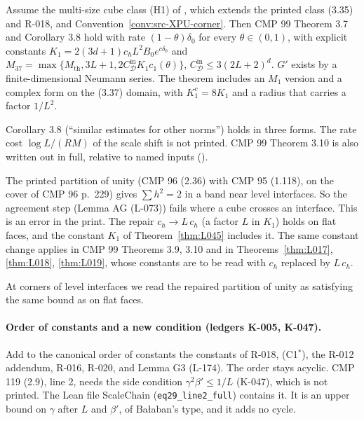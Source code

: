 \begin{theorem}\label{thm:L045}
Assume the multi-size cube class (H1) of , which extends the printed class (3.35) and R-018, and Convention~\ref{conv:src-XPU-corner}. Then CMP 99 Theorem 3.7 and Corollary 3.8 hold with rate $(1-\theta)\delta_0$ for every $\theta\in(0,1)$, with explicit constants $K_1=2(3d+1)c_hL^2B_0e^{c\delta_0}$ and $M_{37}=\max\{M_{\mathrm{th}},3L+1,2C_{\mathcal D}^{\mathrm{in}}K_1c_1(\theta)\}$, $C_{\mathcal D}^{\mathrm{in}}\le3(2L+2)^d$. $G'$ exists by a finite-dimensional Neumann series. The theorem includes an $M_1$ version and a complex form on the (3.37) domain, with $K_1^c=8K_1$ and a radius that carries a factor $1/L^2$.
\end{theorem}
Corollary 3.8 (``similar estimates for other norms'') holds in three forms. The rate cost $\log L/(RM)$ of the scale shift is not printed. CMP 99 Theorem 3.10 is also written out in full, relative to named inputs ().

\begin{remark}
The printed partition of unity (CMP 96 (2.36) with CMP 95 (1.118), on the cover of CMP 96 p.~229) gives $\sum h^2=2$ in a band near level interfaces. So the agreement step (Lemma AG (L-073)) fails where a cube crosses an interface. This is an error in the print. The repair $c_h\to L\,c_h$ (a factor $L$ in $K_1$) holds on flat faces, and the constant $K_1$ of Theorem~\ref{thm:L045} includes it. The same constant change applies in CMP 99 Theorems 3.9, 3.10 and in Theorems~\ref{thm:L017}, \ref{thm:L018}, \ref{thm:L019}, whose constants are to be read with $c_h$ replaced by $L\,c_h$.
\end{remark}

\begin{convention}\label{conv:src-XPU-corner}
At corners of level interfaces we read the repaired partition of unity as satisfying the same bound as on flat faces.
\end{convention}

\paragraph{Order of constants and a new condition (ledgers K-005, K-047).}
\begin{remark}\label{src:ORDER-CANON-EF}
Add to the canonical order of constants the constants of R-018, (C1$^*$), the R-012 addendum, R-016, R-020, and Lemma G3 (L-174). The order stays acyclic. CMP 119 (2.9), line 2, needs the side condition $\gamma^2\beta'\le1/L$ (K-047), which is not printed. The Lean file ScaleChain (\texttt{eq29\_line2\_full}) contains it. It is an upper bound on $\gamma$ after $L$ and $\beta'$, of Ba{\l}aban's type, and it adds no cycle.
\end{remark}


